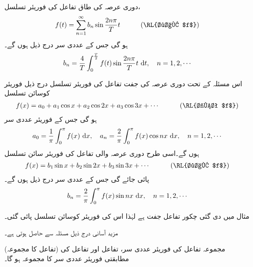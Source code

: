 دوری عرصہ  کی طاق تفاعل  کی فوریئر تسلسل، 
\begin{align}
f(t)=\sum_{n=1}^{\infty} b_n\sin \frac{2n\pi}{T}t\quad \quad \quad (\text{\RL{طاق $f$}})
\end{align}
 ہو گی جس کے عددی سر درج ذیل ہوں گے۔
\begin{align}
b_n=\frac{4}{T}\int_{0}^{\frac{T}{2}}f(t)\sin \frac{2n\pi}{T}t\,\dif t,\quad n=1,2,\cdots
\end{align}

اس مسئلہ کے تحت دوری عرصہ  کی جفت تفاعل  کی فوریئر تسلسل درج ذیل فوریئر کوسائن تسلسل 
\begin{align}
f(x)=a_0+a_1\cos x+a_2\cos 2x+a_3\cos 3x+\cdots\quad \quad \quad (\text{\RL{جفت $f$}})
\end{align} 
ہو گی جس کے فوریئر عددی سر 
\begin{align}
a_0=\frac{1}{\pi}\int_0^{\pi}f(x)\,\dif x,\quad a_n=\frac{2}{\pi}\int_0^{\pi} f(x)\cos nx\,\dif x,\quad n=1,2,\cdots
\end{align}
ہوں گے۔اسی طرح دوری عرصہ  والی تفاعل  کی فوریئر سائن تسلسل 
\begin{align}
f(x)=b_1\sin x+b_2\sin 2x+b_3\sin 3x+\cdots\quad \quad \quad (\text{\RL{طاق $f$}})
\end{align}
پائی جائے گی جس کے عددی سر درج ذیل ہوں گے۔
\begin{align}
b_n=\frac{2}{\pi}\int_0^{\pi}f(x)\sin nx\,\dif x,\quad n=1,2,\cdots
\end{align}

مثال  میں دی گئی چکور تفاعل جفت ہے لہٰذا اس کی فوریئر کوسائن تسلسل پائی گئی۔ 

مزید آسانی درج ذیل مسئلہ سے حاصل ہوتی ہے۔

\quad (تفاعل کا مجموعہ)
مجموعہ تفاعل  کی فوریئر عددی سر،  تفاعل   اور تفاعل  کی مطابقتی فوریئر عددی سر کا مجموعہ ہو گا۔ 

